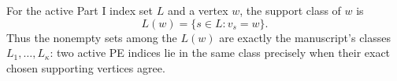 \begin{definition}
For the active Part I index set \(L\) and a vertex \(w\), the support
class of \(w\) is
\[
                 L(w)=\{s\in L:v_s=w\}.
\]
Thus the nonempty sets among the \(L(w)\) are exactly the manuscript's
classes \(L_1,\ldots,L_\kappa\): two active PE indices lie in the same
class precisely when their exact chosen supporting vertices agree.
\end{definition}
